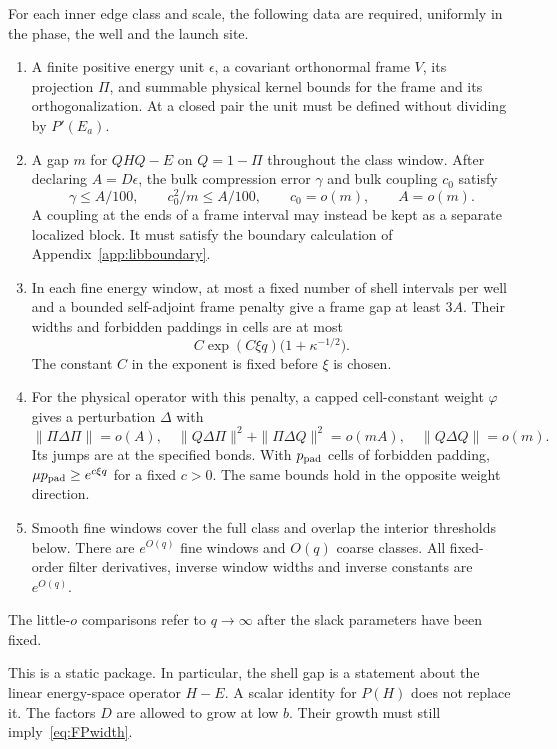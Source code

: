 \begin{definition}\label{def:FPstar}
For each inner edge class and scale, the following data are required,
uniformly in the phase, the well and the launch site.
\begin{enumerate}
\item A finite positive energy unit $\epsilon$, a covariant
orthonormal frame $V$, its projection $\Pi$, and summable physical
kernel bounds for the frame and its orthogonalization. At a closed
pair the unit must be defined without dividing by $P'(E_a)$.
\item A gap $m$ for $QHQ-E$ on $Q=1-\Pi$ throughout the class window.
After declaring $A=D\epsilon$, the bulk compression error $\gamma$
and bulk coupling $c_0$ satisfy
\[
 \gamma\le A/100,\qquad c_0^2/m\le A/100,\qquad
 c_0=o(m),\qquad A=o(m).
\]
A coupling at the ends of a frame interval may instead be kept as a
separate localized block. It must satisfy the boundary calculation
of Appendix~\ref{app:libboundary}.
\item In each fine energy window, at most a fixed number of shell
intervals per well and a bounded self-adjoint frame penalty give a
frame gap at least $3A$. Their widths and forbidden paddings in cells
are at most
\begin{equation}\label{eq:FPwidth}
 C\exp(C\xi q)\bigl(1+\kappa^{-1/2}\bigr).
\end{equation}
The constant $C$ in the exponent is fixed before $\xi$ is chosen.
\item For the physical operator with this penalty, a capped
cell-constant weight $\varphi$ gives a perturbation $\Delta$ with
\[
 \|\Pi\Delta\Pi\|=o(A),\quad
 \|Q\Delta\Pi\|^2+\|\Pi\Delta Q\|^2=o(mA),\quad
 \|Q\Delta Q\|=o(m).
\]
Its jumps are at the specified bonds. With $p_{\rm pad}$ cells of
forbidden padding, $\mu p_{\rm pad}\ge e^{c\xi q}$ for a fixed $c>0$.
The same bounds hold in the opposite weight direction.
\item Smooth fine windows cover the full class and overlap the
interior thresholds below. There are $e^{O(q)}$ fine windows and
$O(q)$ coarse classes. All fixed-order filter derivatives, inverse
window widths and inverse constants are $e^{O(q)}$.
\end{enumerate}
The little-$o$ comparisons refer to $q\to\infty$ after the slack
parameters have been fixed.
\end{definition}

This is a static package. In particular, the shell gap is a statement
about the linear energy-space operator $H-E$. A scalar identity for
$P(H)$ does not replace it. The factors $D$ are allowed to grow at low
$b$. Their growth must still imply~\eqref{eq:FPwidth}.

